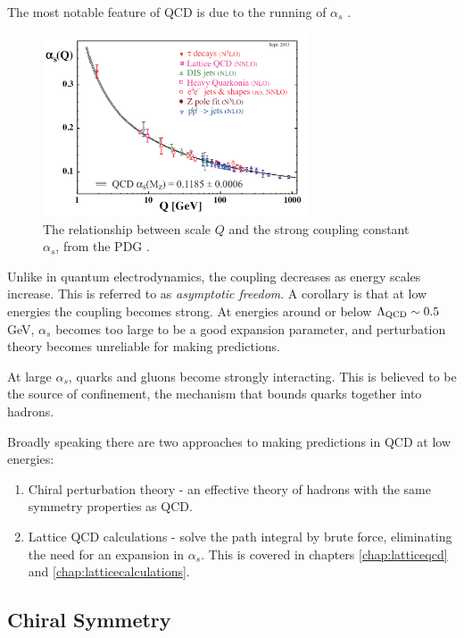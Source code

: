 The most notable feature of QCD is due to the running of $\alpha_s$ \cite{PhysRevLett.30.1343}.
\begin{figure}
  \begin{center}
    \includegraphics[width=0.7\textwidth]{images/QCD-running-coupling.png}
  \end{center}
  \caption{The relationship between scale $Q$ and the strong coupling constant $\alpha_s$, from the PDG \cite{PhysRevD.98.030001}.}
  \label{fig:alpha_s}
\end{figure}
Unlike in quantum electrodynamics, the coupling decreases as energy scales increase. This is referred to as {\it{asymptotic freedom}}. A corollary is that at low energies the coupling becomes strong. At energies around or below $\Lambda_{\text{QCD}} \sim 0.5$GeV, $\alpha_s$ becomes too large to be a good expansion parameter, and perturbation theory becomes unreliable for making predictions.

At large $\alpha_s$, quarks and gluons become strongly interacting. This is believed to be the source of confinement, the mechanism that bounds quarks together into hadrons. %

Broadly speaking there are two approaches to making predictions in QCD at low energies:
\begin{enumerate}
\item
  Chiral perturbation theory - an effective theory of hadrons with the same symmetry properties as QCD.
\item
  Lattice QCD calculations - solve the path integral by brute force, eliminating the need for an expansion in $\alpha_s$. This is covered in chapters \ref{chap:latticeqcd} and \ref{chap:latticecalculations}.
\end{enumerate}

\subsection{Chiral Symmetry}
\label{sec:chiralsymmetry}

